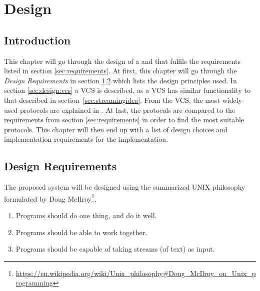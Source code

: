 \chapter{Design} \label{chp:design}

\section{Introduction}
This chapter will go through the design of a  and  that fulfils the requirements listed in section \ref{sec:requirements}.
At first, this chapter will go through the \textit{Design Requirements} in section \ref{sec:design:requirements} which lists the design principles used.
In section \ref{sec:design:vcs} a \ac{VCS} is described, as a \ac{VCS} has similar functionality to that described in section~\ref{sec:streamingidea}.
From the \ac{VCS}, the most widely-used protocols are explained in  .
At last, the protocols are compared to the requirements from section \ref{sec:requirements} in order to find the most suitable protocols.
This chapter will then end up with a list of design choices and implementation requirements for the implementation.

\section{Design Requirements} \label{sec:design:requirements}
The proposed system will be designed using the summarized UNIX philosophy formulated by Doug McIlroy\footnote{\url{https://en.wikipedia.org/wiki/Unix_philosophy\#Doug_McIlroy_on_Unix_programming}}.  

\begin{enumerate}[ref=R-D-\Alph* on P.\thepage, label=\alph*]
	\item Programs should do one thing, and do it well. \label{req:des:onewell}
	\item Programs should be able to work together. \label{req:des:work}
	\item Programs should be capable of taking streams (of text) as input. \label{req:des:text}
\end{enumerate}

